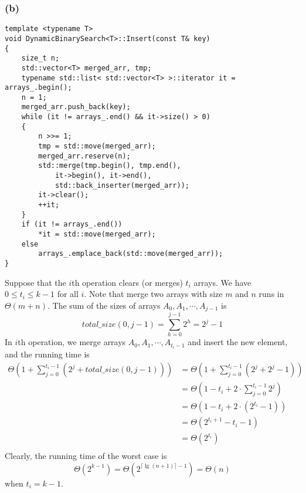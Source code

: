 \subsubsection*{(b)}

\begin{verbatim}
template <typename T>
void DynamicBinarySearch<T>::Insert(const T& key)
{
    size_t n;
    std::vector<T> merged_arr, tmp;
    typename std::list< std::vector<T> >::iterator it = arrays_.begin();
    n = 1;
    merged_arr.push_back(key);
    while (it != arrays_.end() && it->size() > 0)
    {
        n >>= 1;
        tmp = std::move(merged_arr);
        merged_arr.reserve(n);
        std::merge(tmp.begin(), tmp.end(), 
            it->begin(), it->end(), 
            std::back_inserter(merged_arr));
        it->clear();
        ++it;
    }
    if (it != arrays_.end())
        *it = std::move(merged_arr);
    else
        arrays_.emplace_back(std::move(merged_arr));
}
\end{verbatim}

Suppose that the $i$th operation clears (or merges) $t_i$ arrays. 
We have $0 \leq t_i \leq k - 1$ for all $i$.
Note that merge two arrays with size $m$ and $n$ runs in $\Theta(m + n)$.
The sum of the sizes of arrays $A_0, A_1, \cdots, A_{j-1}$ is
\begin{equation*}
    total\_size(0,j-1) = \sum\limits_{h = 0}^{j - 1} 2^h = 2^j - 1
\end{equation*}
In $i$th operation, we merge arrays $A_0, A_1, \cdots, A_{t_i-1}$
and insert the new element,
and the running time is
\begin{equation*}
\begin{split}
    \Theta(1 + \sum_{j = 0}^{t_i - 1} (2^j + total\_size(0, j - 1)))
    & = \Theta(1 + \sum_{j = 0}^{t_i - 1} (2^j + 2^j - 1)) \\
    & = \Theta(1 - t_i + 2 \cdot \sum_{j = 0}^{t_i - 1} 2^j) \\
    & = \Theta(1 - t_i + 2 \cdot (2^{t_i} - 1)) \\ 
    & = \Theta(2^{t_i + 1} - t_i - 1) \\
    & = \Theta(2^{t_i}) \\
\end{split}
\end{equation*}
Clearly, the running time of the worst case is 
\begin{equation*}
    \Theta(2^{k - 1}) = \Theta(2^{\lceil \lg (n + 1) \rceil - 1})
    = \Theta(n)
\end{equation*}
when $t_i = k - 1$.

